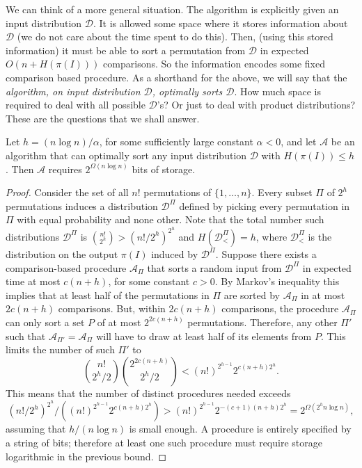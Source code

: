 \documentclass{siamltex}
\newcommand{\cA}{\mathcal{A}}
\newcommand{\D}{\mathcal{D}}
\begin{document}
We can think of a more general situation. The algorithm is explicitly
given an input distribution $\D$. It is allowed some space where it 
stores information about $\D$ (we do not care about the
time spent to do this). Then, (using this stored information)
it must be able to sort a permutation from $\D$ in 
expected $O(n + H(\pi(I)))$ comparisons.
So the information encodes some fixed comparison based procedure.
As a shorthand for the above, we will say that the \emph{algorithm,
on input distribution $\D$, optimally sorts $\D$}.
How much space is required to deal with all possible $\D$'s?
Or just to deal with product distributions? These are the
questions that we shall answer.
\medskip
\begin{lemma}\label{lem:exp-lower-bound} 
Let $h = (n\log n)/\alpha$, for some sufficiently large constant 
$\alpha < 0$, and let $\cA$ be an algorithm that can optimally sort any input 
distribution $\D$ with $H(\pi(I)) \leq h$.
Then $\cA$ requires $2^{\Omega(n \log n)}$ bits of storage.
\end{lemma}

\begin{proof}
Consider the set of all $n!$ permutations of $\{1, \ldots, n\}$.
Every subset $\Pi$ of $2^h$ permutations induces a distribution $\D^\Pi$
defined by picking every permutation in $\Pi$ with equal probability
and none other. Note that the total number such distributions $\D^\Pi$ is
$\binom{n!}{2^h} > (n!/2^h)^{2^h}$ and $H(\D_{<}^\Pi)= h$,
where $\D_{<}^\Pi$ is the distribution on the output $\pi(I)$ induced by
$\D^\Pi$.
Suppose there exists a comparison-based procedure ${\cA}_\Pi$ that sorts 
a random input from $\D^\Pi$ in expected time at most $c(n+h)$, 
for some constant $c>0$.
By Markov's inequality this implies that 
at least half of the permutations in $\Pi$ are sorted by 
${\cA}_\Pi$ in at most $2c(n+h)$ comparisons.
But, within $2c(n+h)$ comparisons, the procedure 
${\cA}_\Pi$ can only sort a set $P$ of at most $2^{2c(n+h)}$ permutations. 
Therefore, any other $\Pi'$ such that ${\cA}_{\Pi'} = {\cA}_\Pi$
will have to draw at least half of its elements from $P$.
This limits the number of such $\Pi'$ to 
\[ 
\binom{n!}{2^h/2}\binom{2^{2c(n+h)}}{2^h/2} < (n!)^{2^{h-1}}2^{c(n+h)2^h}. 
\]
This means that the number of distinct procedures needed
exceeds 
\[
(n!/2^h)^{2^h}/((n!)^{2^{h-1}}2^{c(n+h)2^h}) >
(n!)^{2^{h-1}}  2^{-(c+1)(n+h){2^h}} = 2^{\Omega(2^h n\log n)},
\]
assuming that $h/(n\log n)$ is small enough.
A procedure is entirely specified by a string of bits; therefore 
at least one such procedure must require storage logarithmic in the previous 
bound.
\end{proof}
\medskip
\end{document}
